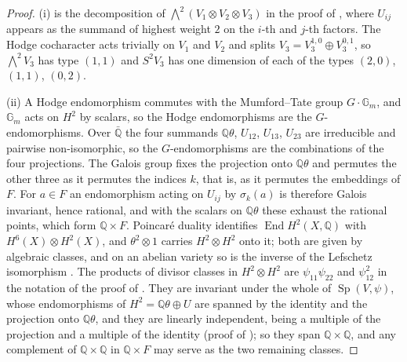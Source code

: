 \documentclass[11pt,reqno]{amsart}
\theoremstyle{plain}
\theoremstyle{definition}
\theoremstyle{remark}
\newcommand{\QQ}{\mathbb{Q}}
\DeclareMathOperator{\End}{End}
\DeclareMathOperator{\Sp}{Sp}
\begin{document}
\begin{proof}
(i) is the decomposition of $\bigwedge^{2}(V_{1}\otimes V_{2}\otimes V_{3})$
in the proof of , where $U_{ij}$ appears as the
summand of highest weight $2$ on the $i$-th and $j$-th factors. The Hodge
cocharacter acts trivially on $V_{1}$ and $V_{2}$ and splits
$V_{3}=V_{3}^{1,0}\oplus V_{3}^{0,1}$, so $\bigwedge^{2}V_{3}$ has type
$(1,1)$ and $S^{2}V_{3}$ has one dimension of each of the types $(2,0)$,
$(1,1)$, $(0,2)$.

(ii) A Hodge endomorphism commutes with the Mumford--Tate group
$G\cdot\mathbb{G}_{m}$, and $\mathbb{G}_{m}$ acts on $H^{2}$ by scalars, so
the Hodge endomorphisms are the $G$-endomorphisms. Over $\bar{\QQ}$ the four
summands $\QQ\theta$, $U_{12}$, $U_{13}$, $U_{23}$ are irreducible and
pairwise non-isomorphic, so the $G$-endomorphisms are the combinations of the
four projections. The Galois group fixes the projection onto $\QQ\theta$ and
permutes the other three as it permutes the indices $k$, that is, as it
permutes the embeddings of $F$. For $a\in F$ an endomorphism acting on
$U_{ij}$ by $\sigma_{k}(a)$ is therefore Galois invariant, hence rational, and
with the scalars on $\QQ\theta$ these exhaust the rational points, which form
$\QQ\times F$. Poincar\'e duality identifies $\End H^{2}(X,\QQ)$ with
$H^{6}(X)\otimes H^{2}(X)$, and $\theta^{2}\otimes1$ carries
$H^{2}\otimes H^{2}$ onto it; both are given by algebraic classes, and on an
abelian variety so is the inverse of the Lefschetz isomorphism
\cite[\S2]{Kle68}. The products of divisor classes in $H^{2}\otimes H^{2}$
are $\psi_{11}\psi_{22}$ and $\psi_{12}^{2}$ in the notation of the proof of
. They are invariant under the whole of
$\Sp(V,\psi)$, whose endomorphisms of $H^{2}=\QQ\theta\oplus U$ are spanned
by the identity and the projection onto $\QQ\theta$, and they are linearly
independent, being a multiple of the projection and a multiple of the
identity (proof of ); so they span $\QQ\times\QQ$, and any complement of
$\QQ\times\QQ$ in $\QQ\times F$ may serve as the two remaining classes.


\end{proof}
\end{document}
